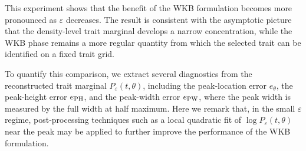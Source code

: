 \documentclass[11pt]{article}
\numberwithin{equation}{section}
\begin{document}
This experiment shows that the benefit of the WKB formulation becomes more
pronounced as \(\varepsilon\) decreases. The result is consistent with the
asymptotic picture that the density-level trait marginal develops a narrow
concentration, while the WKB phase remains a more regular quantity from
which the selected trait can be identified on a fixed trait grid.

To quantify this comparison, we extract several diagnostics from the reconstructed trait marginal $P_\varepsilon(t,\theta)$, 
including the peak-location error \(e_\theta\), the peak-height error \(e_{\rm PH}\), and the peak-width error \(e_{\rm PW}\), where the peak width is measured by the full width at half maximum.
Here we remark that, in the small \(\varepsilon\) regime, post-processing techniques such as a local quadratic fit of \(\log P_\varepsilon(t,\theta)\) near the peak may be applied to further improve the performance  of the WKB formulation. 





%
\end{document}
